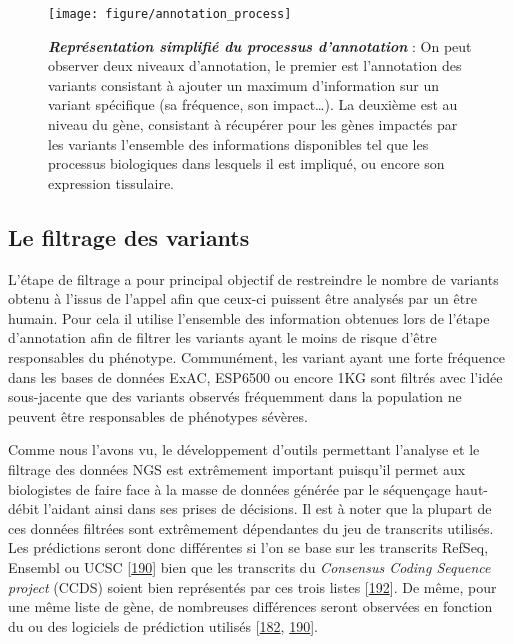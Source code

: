 \documentclass[12pt,a4paper,twoside]{ugathesis}
\theoremstyle{definition}
\theoremstyle{definition}
\theoremstyle{definition}
\theoremstyle{remark}
\begin{document}
\begin{figure}

{\centering \texttt{[image: figure/annotation\_process]} 

}

\caption[Représentation simplifié du processus d'annotation]{\textbf{\emph{Représentation simplifié du processus
d'annotation}} : On peut observer deux niveaux d'annotation, le premier
est l'annotation des variants consistant à ajouter un maximum
d'information sur un variant spécifique (sa fréquence, son
impact\ldots{}). La deuxième est au niveau du gène, consistant à
récupérer pour les gènes impactés par les variants l'ensemble des
informations disponibles tel que les processus biologiques dans lesquels
il est impliqué, ou encore son expression tissulaire.}\label{fig:pictannot}
\end{figure}










\newpage

\subsection{Le filtrage des variants}\label{le-filtrage-des-variants}

L'étape de filtrage a pour principal objectif de restreindre le nombre
de variants obtenu à l'issus de l'appel afin que ceux-ci puissent être
analysés par un être humain. Pour cela il utilise l'ensemble des
information obtenues lors de l'étape d'annotation afin de filtrer les
variants ayant le moins de risque d'être responsables du phénotype.
Communément, les variant ayant une forte fréquence dans les bases de
données ExAC, ESP6500 ou encore 1KG sont filtrés avec l'idée
sous-jacente que des variants observés fréquemment dans la population ne
peuvent être responsables de phénotypes sévères.

Comme nous l'avons vu, le développement d'outils permettant l'analyse et
le filtrage des données NGS est extrêmement important puisqu'il permet
aux biologistes de faire face à la masse de données générée par le
séquençage haut-débit l'aidant ainsi dans ses prises de décisions. Il
est à noter que la plupart de ces données filtrées sont extrêmement
dépendantes du jeu de transcrits utilisés. Les prédictions seront donc
différentes si l'on se base sur les transcrits RefSeq, Ensembl ou UCSC
{[}\protect\hyperlink{ref-McCarthy2014}{190}{]} bien que les transcrits
du \emph{Consensus Coding Sequence project} (CCDS) soient bien
représentés par ces trois listes
{[}\protect\hyperlink{ref-Pruitt2009}{192}{]}. De même, pour une même
liste de gène, de nombreuses différences seront observées en fonction du
ou des logiciels de prédiction utilisés
{[}\protect\hyperlink{ref-Salgado2016}{182},
\protect\hyperlink{ref-McCarthy2014}{190}{]}.
\end{document}
